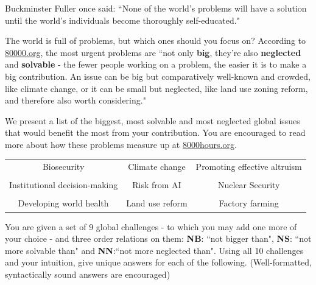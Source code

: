 \documentclass[addpoints]{exam}
\begin{document}
\begin{questions}
\begin{parts}
  \begin{solution}
  \end{solution}
\end{parts}

\question Buckminster Fuller once said: ``None of the world’s problems will have a solution until the world’s individuals become thoroughly self-educated."

The world is full of problems, but which ones should you focus on? According to \href{http://8000hours.org}{80000.org}, the most urgent problems are ``not only \textbf{big}, they're also \textbf{neglected} and \textbf{solvable} - the fewer people working on a problem, the easier it is to make a big contribution. An issue can be big but comparatively well-known and crowded, like climate change, or it can be small but neglected, like land use zoning reform, and therefore also worth considering."

We present a list of the biggest, most solvable and most neglected global issues that would benefit the most from your contribution. You are encouraged to read more about how these problems measure up at \href{https://80000hours.org/articles/cause-selection/}{8000hours.org}.
\begin{center}
\begin{tabular}{ c c c}
Biosecurity & Climate change & Promoting effective altruism\\\\
Institutional decision-making & Risk from AI & Nuclear Security\\\\
Developing world health & Land use reform & Factory farming
\end{tabular}
\end{center}

You are given a set of 9 global challenges - to which you may add one more of your choice - and three order relations on them: \textbf{NB}: ``not bigger than", \textbf{NS}: ``not more solvable than" and \textbf{NN}:``not more neglected than". Using all 10 challenges and your intuition, give unique answers for each of the following. (Well-formatted, syntactically sound answers are encouraged) 

\end{questions}
\end{document}
